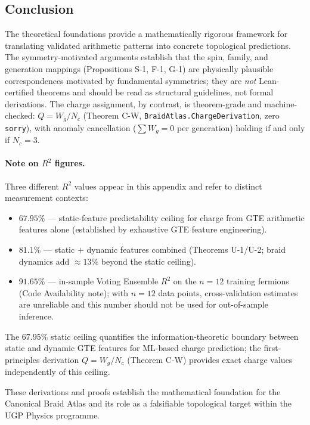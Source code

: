 \documentclass[11pt]{article}
\theoremstyle{remark}
\begin{document}
\subsection{Conclusion}

The theoretical foundations provide a mathematically rigorous framework for translating validated arithmetic patterns into concrete topological predictions.
The symmetry-motivated arguments establish that the spin, family, and generation mappings (Propositions S-1, F-1, G-1) are physically plausible correspondences motivated by fundamental symmetries; they are \emph{not} Lean-certified theorems and should be read as structural guidelines, not formal derivations. The charge assignment, by contrast, is theorem-grade and machine-checked: $Q = W_g / N_c$ (Theorem C-W, \texttt{BraidAtlas.ChargeDerivation}, zero \texttt{sorry}), with anomaly cancellation ($\sum W_g = 0$ per generation) holding if and only if $N_c = 3$.

\paragraph{Note on $R^2$ figures.}
Three different $R^2$ values appear in this appendix and refer to distinct measurement contexts:
\begin{itemize}[leftmargin=1.4em,itemsep=0.05em]
  \item \textbf{$67.95\%$} --- static-feature predictability ceiling for charge from GTE arithmetic features alone (established by exhaustive GTE feature engineering).
  \item \textbf{$81.1\%$} --- static $+$ dynamic features combined (Theorems U-1/U-2; braid dynamics add $\approx 13\%$ beyond the static ceiling).
  \item \textbf{$91.65\%$} --- in-sample Voting Ensemble $R^2$ on the $n=12$ training fermions (Code Availability note); with $n=12$ data points, cross-validation estimates are unreliable and this number should not be used for out-of-sample inference.
\end{itemize}
The $67.95\%$ static ceiling quantifies the information-theoretic boundary between static and dynamic GTE features for ML-based charge prediction; the first-principles derivation $Q = W_g/N_c$ (Theorem C-W) provides exact charge values independently of this ceiling.

These derivations and proofs establish the mathematical foundation for the Canonical Braid Atlas and its role as a falsifiable topological target within the UGP Physics programme.
\end{document}
